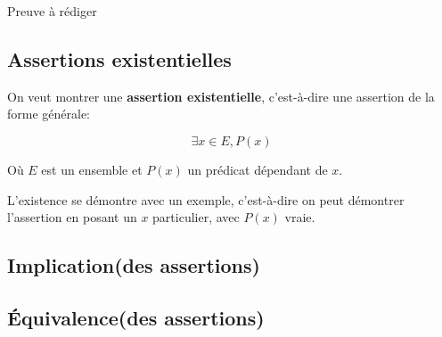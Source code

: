 \documentclass{article}
\begin{document}
\noindent Preuve à rédiger




\subsection{Assertions existentielles}

On veut montrer une \textbf{assertion existentielle}, c'est-à-dire une assertion de la forme générale:

\[
\exists x \in E, P(x)
\]

Où $E$ est un ensemble et $P(x)$ un prédicat dépendant de $x$.

\begin{tcolorbox}[colback=green!5!white,colframe=green!75!black,title=Point méthode]

L'existence se démontre avec un exemple, c'est-à-dire on peut démontrer l'assertion en posant un $x$ particulier, avec $P(x)$ vraie.

\end{tcolorbox}


\begin{tcolorbox}[colback=cyan!5!white,colframe=cyan!75!black,title=Exercice]


\end{tcolorbox}

\subsection{Implication(des assertions)}

\begin{tcolorbox}[colback=green!5!white,colframe=green!75!black,title=Point méthode]


\end{tcolorbox}


\begin{tcolorbox}[colback=cyan!5!white,colframe=cyan!75!black,title=Exercice]


\end{tcolorbox}

\subsection{Équivalence(des assertions)}

\begin{tcolorbox}[colback=green!5!white,colframe=green!75!black,title=Point méthode]


\end{tcolorbox}
\end{document}
